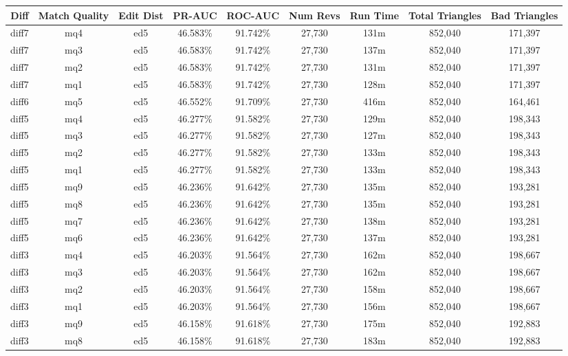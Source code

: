 \begin{sidewaystable}[!ph]
  \begin{center}
    \begin{tabular}{|c|c|c||c|c||c|c|c|c|}
\hline
Diff & Match Quality & Edit Dist
        & PR-AUC & ROC-AUC
        & Num Revs & Run Time
        & Total Triangles & Bad Triangles \\
\hline
\hline
diff7 & mq4 & ed5 & 46.583\% & 91.742\% & 27,730 & 131m & 852,040 & 171,397 \\
diff7 & mq3 & ed5 & 46.583\% & 91.742\% & 27,730 & 137m & 852,040 & 171,397 \\
diff7 & mq2 & ed5 & 46.583\% & 91.742\% & 27,730 & 131m & 852,040 & 171,397 \\
diff7 & mq1 & ed5 & 46.583\% & 91.742\% & 27,730 & 128m & 852,040 & 171,397 \\
diff6 & mq5 & ed5 & 46.552\% & 91.709\% & 27,730 & 416m & 852,040 & 164,461 \\
diff5 & mq4 & ed5 & 46.277\% & 91.582\% & 27,730 & 129m & 852,040 & 198,343 \\
diff5 & mq3 & ed5 & 46.277\% & 91.582\% & 27,730 & 127m & 852,040 & 198,343 \\
diff5 & mq2 & ed5 & 46.277\% & 91.582\% & 27,730 & 133m & 852,040 & 198,343 \\
diff5 & mq1 & ed5 & 46.277\% & 91.582\% & 27,730 & 133m & 852,040 & 198,343 \\
diff5 & mq9 & ed5 & 46.236\% & 91.642\% & 27,730 & 135m & 852,040 & 193,281 \\
diff5 & mq8 & ed5 & 46.236\% & 91.642\% & 27,730 & 135m & 852,040 & 193,281 \\
diff5 & mq7 & ed5 & 46.236\% & 91.642\% & 27,730 & 138m & 852,040 & 193,281 \\
diff5 & mq6 & ed5 & 46.236\% & 91.642\% & 27,730 & 137m & 852,040 & 193,281 \\
diff3 & mq4 & ed5 & 46.203\% & 91.564\% & 27,730 & 162m & 852,040 & 198,667 \\
diff3 & mq3 & ed5 & 46.203\% & 91.564\% & 27,730 & 162m & 852,040 & 198,667 \\
diff3 & mq2 & ed5 & 46.203\% & 91.564\% & 27,730 & 158m & 852,040 & 198,667 \\
diff3 & mq1 & ed5 & 46.203\% & 91.564\% & 27,730 & 156m & 852,040 & 198,667 \\
diff3 & mq9 & ed5 & 46.158\% & 91.618\% & 27,730 & 175m & 852,040 & 192,883 \\
diff3 & mq8 & ed5 & 46.158\% & 91.618\% & 27,730 & 183m & 852,040 & 192,883 \\

\end{tabular}
\end{center}
\end{sidewaystable}
